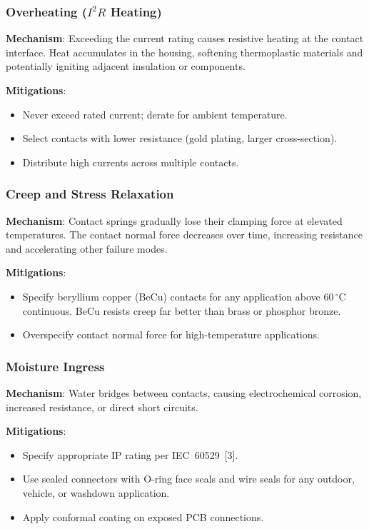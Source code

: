 \documentclass[11pt,letterpaper,twoside,openany]{book}
\newcommand{\degC}{\ensuremath{{}^{\circ}\text{C}}}
\begin{document}
\subsubsection{Overheating ($I^2 R$ Heating)}

\textbf{Mechanism}: Exceeding the current rating causes resistive heating at the contact interface. Heat accumulates in the housing, softening thermoplastic materials and potentially igniting adjacent insulation or components.

\textbf{Mitigations}:
\begin{itemize}[nosep,leftmargin=1.5em]
  \item Never exceed rated current; derate for ambient temperature.
  \item Select contacts with lower resistance (gold plating, larger cross-section).
  \item Distribute high currents across multiple contacts.
\end{itemize}

\subsubsection{Creep and Stress Relaxation}

\textbf{Mechanism}: Contact springs gradually lose their clamping force at elevated temperatures. The contact normal force decreases over time, increasing resistance and accelerating other failure modes.

\textbf{Mitigations}:
\begin{itemize}[nosep,leftmargin=1.5em]
  \item Specify beryllium copper (BeCu) contacts for any application above 60\,\degC{} continuous. BeCu resists creep far better than brass or phosphor bronze.
  \item Overspecify contact normal force for high-temperature applications.
\end{itemize}

\subsubsection{Moisture Ingress}

\textbf{Mechanism}: Water bridges between contacts, causing electrochemical corrosion, increased resistance, or direct short circuits.

\textbf{Mitigations}:
\begin{itemize}[nosep,leftmargin=1.5em]
  \item Specify appropriate IP rating per IEC~60529~[3].
  \item Use sealed connectors with O-ring face seals and wire seals for any outdoor, vehicle, or washdown application.
  \item Apply conformal coating on exposed PCB connections.
\end{itemize}
\end{document}
